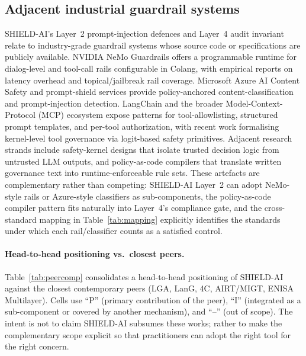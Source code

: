 \documentclass[preprint,12pt,authoryear]{elsarticle}
\begin{document}
\subsection{Adjacent industrial guardrail systems}
SHIELD-AI's Layer~2 prompt-injection defences and Layer~4 audit invariant relate to industry-grade guardrail systems whose source code or specifications are publicly available. NVIDIA NeMo Guardrails offers a programmable runtime for dialog-level and tool-call rails configurable in Colang, with empirical reports on latency overhead and topical/jailbreak rail coverage. Microsoft Azure AI Content Safety and prompt-shield services provide policy-anchored content-classification and prompt-injection detection. LangChain and the broader Model-Context-Protocol (MCP) ecosystem expose patterns for tool-allowlisting, structured prompt templates, and per-tool authorization, with recent work formalising kernel-level tool governance via logit-based safety primitives. Adjacent research strands include safety-kernel designs that isolate trusted decision logic from untrusted LLM outputs, and policy-as-code compilers that translate written governance text into runtime-enforceable rule sets. These artefacts are complementary rather than competing: SHIELD-AI Layer~2 can adopt NeMo-style rails or Azure-style classifiers as sub-components, the policy-as-code compiler pattern fits naturally into Layer~4's compliance gate, and the cross-standard mapping in Table~\ref{tab:mapping} explicitly identifies the standards under which each rail/classifier counts as a satisfied control.

\paragraph{Head-to-head positioning vs.\ closest peers.}
Table~\ref{tab:peercomp} consolidates a head-to-head positioning of SHIELD-AI against the closest contemporary peers (LGA, LanG, 4C, AIRT/MIGT, ENISA Multilayer). Cells use ``P'' (primary contribution of the peer), ``I'' (integrated as a sub-component or covered by another mechanism), and ``--'' (out of scope). The intent is not to claim SHIELD-AI subsumes these works; rather to make the complementary scope explicit so that practitioners can adopt the right tool for the right concern.
\end{document}
